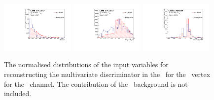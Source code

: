 \begin{figure}[htbp]
		\includegraphics[width=0.32\textwidth]{6_Search/Figures/PlotsTechnics/TotalHt_lepZutsingletopuuu_norm}
	\includegraphics[width=0.32\textwidth]{6_Search/Figures/PlotsTechnics/charge_asymZutsingletopuuu_norm}
			\includegraphics[width=0.32\textwidth]{6_Search/Figures/PlotsTechnics/ptWQZutsingletopuuu_norm}
	\caption{The normalised distributions of the input variables for reconstructing the multivariate discriminator in the \STSR\ for the \Zut\ vertex for the \mumumu\ channel. The contribution of the \NPL\ background is not included. }
	\label{fig:singletopZutnormalized}
\end{figure}
